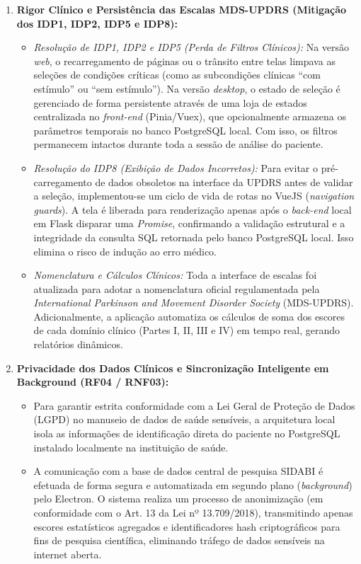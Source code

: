 \begin{enumerate}
    \item \textbf{Rigor Clínico e Persistência das Escalas MDS-UPDRS (Mitigação dos IDP1, IDP2, IDP5 e IDP8):}
    \begin{itemize}
        \item \textit{Resolução de IDP1, IDP2 e IDP5 (Perda de Filtros Clínicos):} Na versão \textit{web}, o recarregamento de páginas ou o trânsito entre telas limpava as seleções de condições críticas (como as subcondições clínicas ``com estímulo'' ou ``sem estímulo''). Na versão \textit{desktop}, o estado de seleção é gerenciado de forma persistente através de uma loja de estados centralizada no \textit{front-end} (Pinia/Vuex), que opcionalmente armazena os parâmetros temporais no banco PostgreSQL local. Com isso, os filtros permanecem intactos durante toda a sessão de análise do paciente.
        \item \textit{Resolução do IDP8 (Exibição de Dados Incorretos):} Para evitar o pré-carregamento de dados obsoletos na interface da UPDRS antes de validar a seleção, implementou-se um ciclo de vida de rotas no VueJS (\textit{navigation guards}). A tela é liberada para renderização apenas após o \textit{back-end} local em Flask disparar uma \textit{Promise}, confirmando a validação estrutural e a integridade da consulta SQL retornada pelo banco PostgreSQL local. Isso elimina o risco de indução ao erro médico.
        \item \textit{Nomenclatura e Cálculos Clínicos:} Toda a interface de escalas foi atualizada para adotar a nomenclatura oficial regulamentada pela \textit{International Parkinson and Movement Disorder Society} (MDS-UPDRS). Adicionalmente, a aplicação automatiza os cálculos de soma dos escores de cada domínio clínico (Partes I, II, III e IV) em tempo real, gerando relatórios dinâmicos.
    \end{itemize}

    \item \textbf{Privacidade dos Dados Clínicos e Sincronização Inteligente em Background (RF04 / RNF03):}
    \begin{itemize}
        \item Para garantir estrita conformidade com a Lei Geral de Proteção de Dados (LGPD) no manuseio de dados de saúde sensíveis, a arquitetura local isola as informações de identificação direta do paciente no PostgreSQL instalado localmente na instituição de saúde. 
        \item A comunicação com a base de dados central de pesquisa SIDABI \cite{folador2021} é efetuada de forma segura e automatizada em segundo plano (\textit{background}) pelo Electron. O sistema realiza um processo de anonimização (em conformidade com o Art. 13 da Lei nº 13.709/2018), transmitindo apenas escores estatísticos agregados e identificadores hash criptográficos para fins de pesquisa científica, eliminando tráfego de dados sensíveis na internet aberta.
    \end{itemize}


\end{enumerate}
